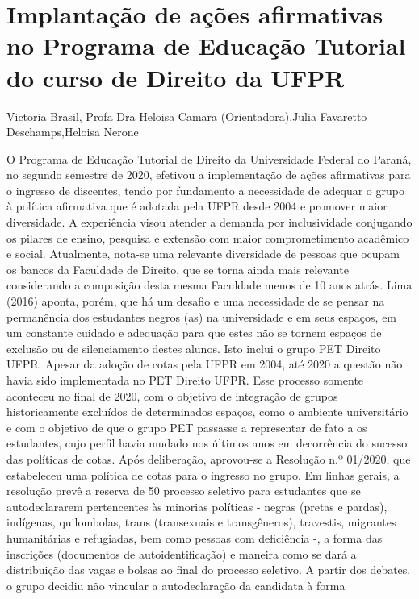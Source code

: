 

\section{Implantação de ações afirmativas no Programa de Educação Tutorial do curso de Direito da UFPR}

Victoria Brasil, Profa Dra Heloisa Camara (Orientadora),Julia Favaretto Deschamps,Heloisa Nerone

O Programa de Educação Tutorial de Direito da Universidade Federal do Paraná, no
segundo semestre de 2020, efetivou a implementação de ações afirmativas para o ingresso de
discentes, tendo por fundamento a necessidade de adequar o grupo à política afirmativa que é
adotada pela UFPR desde 2004 e promover maior diversidade. A experiência visou atender a
demanda por inclusividade conjugando os pilares de ensino, pesquisa e extensão com maior
comprometimento acadêmico e social.
Atualmente, nota-se uma relevante diversidade de pessoas que ocupam os bancos da
Faculdade de Direito, que se torna ainda mais relevante considerando a composição desta mesma
Faculdade menos de 10 anos atrás. Lima (2016) aponta, porém, que há um desafio e uma
necessidade de se pensar na permanência dos estudantes negros (as) na universidade e em seus
espaços, em um constante cuidado e adequação para que estes não se tornem espaços de
exclusão ou de silenciamento destes alunos. Isto inclui o grupo PET Direito UFPR.
Apesar da adoção de cotas pela UFPR em 2004, até 2020 a questão não havia sido
implementada no PET Direito UFPR. Esse processo somente aconteceu no final de 2020, com o
objetivo de integração de grupos historicamente excluídos de determinados espaços, como o
ambiente universitário e com o objetivo de que o grupo PET passasse a representar de fato a os
estudantes, cujo perfil havia mudado nos últimos anos em decorrência do sucesso das políticas
de cotas. Após deliberação, aprovou-se a Resolução n.º 01/2020, que estabeleceu uma política
de cotas para o ingresso no grupo.
Em linhas gerais, a resolução prevê a reserva de 50%
processo seletivo para estudantes que se autodeclararem pertencentes às minorias políticas -
negras (pretas e pardas), indígenas, quilombolas, trans (transexuais e transgêneros), travestis,
migrantes humanitárias e refugiadas, bem como pessoas com deficiência -, a forma das
inscrições (documentos de autoidentificação) e maneira como se dará a distribuição das vagas e
bolsas ao final do processo seletivo.
A partir dos debates, o grupo decidiu não vincular a autodeclaração da candidata à forma
